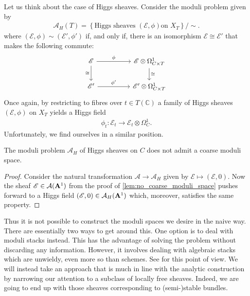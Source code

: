\documentclass[12pt]{ociamthesis}  %
\begin{document}
Let us think about the case of Higgs sheaves. Consider the moduli problem
given by 
\begin{align*}
  \mathcal A_H(T) = \left\lbrace{\text{Higgs sheaves $(\mathscr E,\phi)$
      on $X_T$}}\right\rbrace/\sim.
\end{align*}
where $(\mathscr E,\phi)\sim(\mathscr E',\phi')$ if, and only if,
there is an isomorphism $\mathscr E\cong\mathscr E'$ that makes the
following commute:
\begin{equation*}
  \begin{tikzcd}
    {\mathscr E} && {\mathscr E\otimes \Omega^1_{C\times T}} \\
    {\mathscr E'} && {\mathscr E'\otimes\Omega^1_{C\times T}}
    \arrow["\phi", from=1-1, to=1-3]
    \arrow["\cong"', from=1-1, to=2-1]
    \arrow["\cong", from=1-3, to=2-3]
    \arrow["{\phi'}", from=2-1, to=2-3]
  \end{tikzcd}
\end{equation*}
Once again, by restricting to fibres over $t\in T(\mathbb{C})$
a family of Higgs sheaves $(\mathscr E,\phi)$ on $X_T$ yields
a Higgs field
\begin{align*}
  \phi_t : \mathscr E_t \to \mathscr E_t \otimes \Omega^1_C.
\end{align*}
Unfortunately, we find ourselves in a similar position.
\begin{corollary}
  The moduli problem $\mathcal A_H$ of Higgs sheaves on $C$ does not admit
  a coarse moduli space.
  \begin{proof}
    Consider the natural transformation $\mathcal A\to\mathcal A_H$
    given by $\mathscr E \mapsto (\mathscr E,0)$. Now the sheaf
    $\mathscr E\in\mathcal A(\mathbf{A}^{1}_{})$ from the proof of
    \ref{lem:no_coarse_moduli_space} pushes forward to a Higgs field
    $(\mathscr E,0)\in\mathcal A_H(\mathbf{A}^{1}_{})$ which, moreover,
    satisfies the same property.
  \end{proof}
\end{corollary}
Thus it is not possible to construct the moduli spaces we desire
in the naive way. There are essentially two ways to get around this.
One option is to deal with
moduli stacks instead. This has the advantage of solving the problem
without discarding any information. However, it involves dealing with
algebraic stacks which are unwieldy, even more so than schemes.
See \cite{cm2017} for this point of view. We will instead take an
approach that is much in line with the analytic construction by narrowing
our attention to a subclass of locally free sheaves. Indeed, we are
going to end up with those sheaves corresponding to (semi-)stable
bundles.
\end{document}
